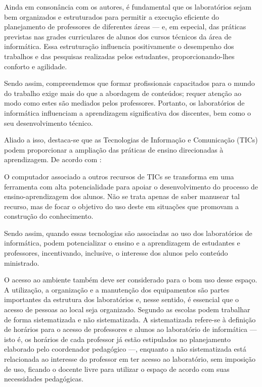 \documentclass[12pt, openright, oneside, a4paper, brazil]{abntex2}
\begin{document}
	Ainda em consonância com os autores, é fundamental que os laboratórios sejam bem organizados e estruturados para permitir a execução eficiente do planejamento de professores de diferentes áreas — e, em especial, das práticas previstas nas grades curriculares de alunos dos cursos técnicos da área de informática. Essa estruturação influencia positivamente o desempenho dos trabalhos e das pesquisas realizadas pelos estudantes, proporcionando-lhes conforto e agilidade.

	Sendo assim, compreendemos que formar profissionais capacitados para o mundo do trabalho exige mais do que a abordagem de conteúdos; requer atenção ao modo como estes são mediados pelos professores. Portanto, os laboratórios de informática influenciam a aprendizagem significativa dos discentes, bem como o seu desenvolvimento técnico.

	Aliado a isso, destaca-se que as Tecnologias de Informação e Comunicação (TICs) podem proporcionar a ampliação das práticas de ensino direcionadas à aprendizagem. De acordo com :

\begin{citacao}
		O computador associado a outros recursos de TICs se transforma em uma ferramenta com alta potencialidade para apoiar o desenvolvimento do processo de ensino-aprendizagem dos alunos. Não se trata apenas de saber manusear tal recurso, mas de focar o objetivo do uso deste em situações que promovam a construção do conhecimento.
\end{citacao}

	Sendo assim, quando essas tecnologias são associadas ao uso dos laboratórios de informática, podem potencializar o ensino e a aprendizagem de estudantes e professores, incentivando, inclusive, o interesse dos alunos pelo conteúdo ministrado.

O acesso ao ambiente também deve ser considerado para o bom uso desse espaço. A utilização, a organização e a manutenção dos equipamentos são partes importantes da estrutura dos laboratórios e, nesse sentido, é essencial que o acesso de pessoas ao local seja organizado. Segundo  as escolas podem trabalhar de forma sistematizada e não sistematizada. A sistematizada refere-se à definição de horários para o acesso de professores e alunos ao laboratório de informática — isto é, os horários de cada professor já estão estipulados no planejamento elaborado pelo coordenador pedagógico —, enquanto a não sistematizada está relacionada ao interesse do professor em ter acesso ao laboratório, sem imposição de uso, ficando o docente livre para utilizar o espaço de acordo com suas necessidades pedagógicas.
\end{document}
